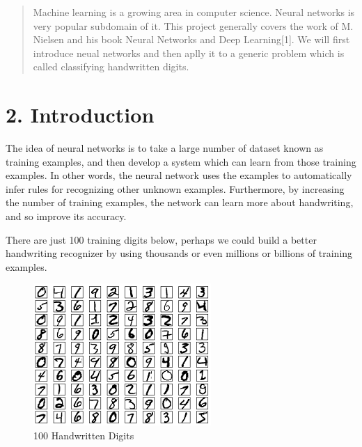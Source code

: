 \documentclass[12 pt]{article}
\begin{document}
\onehalfspacing
\pagestyle{plain}
\tableofcontents
\setcounter{page}{1}

\begin{abstract}
    \thispagestyle{plain}
    \setcounter{page}{2}
    Machine learning is a growing area in computer science. Neural networks
    is very popular subdomain of it. This project generally covers the work
    of M. Nielsen and his book Neural Networks and Deep Learning{[}1{]}. We
    will first introduce neual networks and then aplly it to a generic
    problem which is called classifying handwritten digits.
\end{abstract}

%

\section{2. Introduction}\label{introduction}

The idea of neural networks is to take a large number of dataset known
as training examples, and then develop a system which can learn from
those training examples. In other words, the neural network uses the
examples to automatically infer rules for recognizing other unknown
examples. Furthermore, by increasing the number of training examples,
the network can learn more about handwriting, and so improve its
accuracy.

There are just 100 training digits below, perhaps we could build a
better handwriting recognizer by using thousands or even millions or
billions of training examples.

\begin{figure}[htp]
\centering
\includegraphics{./figs/mnist_100_digits.png}
\caption{100 Handwritten Digits}
\end{figure}
\end{document}
